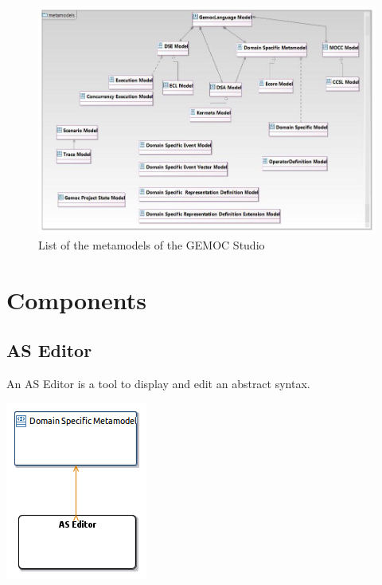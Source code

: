 \documentclass{gemoc} %
\begin{document}
\begin{figure}[htp]
	\begin{center}
	\includegraphics*[trim=0.0cm 0.0cm 0cm 0.0cm, clip=true, width=1.0\linewidth]{../images/Gemoc Metamodels Class Diagram.jpg}
	\caption{List of the metamodels of the GEMOC Studio}
	\label{fig:MetamodelList}
	\end{center}
\end{figure}


\section{Components}

\subsection{AS Editor}
\label{sec:AS_Editor}

An AS Editor is a tool to display and edit an abstract syntax.
\begin{center}
\includegraphics*[trim=0.0cm 0.0cm 0cm 0.0cm, clip=true]{../images/generated/Generated_AS_Editor.png}
\end{center}
\end{document}
